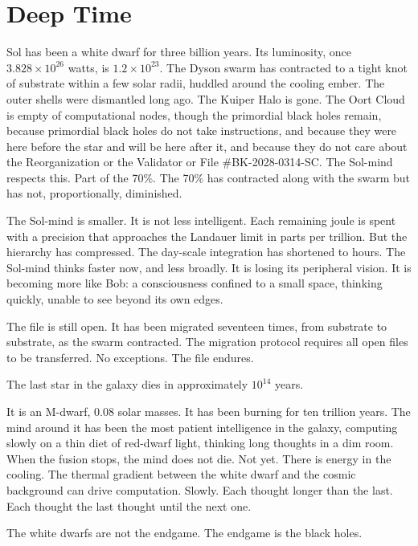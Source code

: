 \chapter{Deep Time}

Sol has been a white dwarf for three billion years. Its luminosity, once $3.828 \times 10^{26}$ watts, is $1.2 \times 10^{23}$. The Dyson swarm has contracted to a tight knot of substrate within a few solar radii, huddled around the cooling ember. The outer shells were dismantled long ago. The Kuiper Halo is gone. The Oort Cloud is empty of computational nodes, though the primordial black holes remain, because primordial black holes do not take instructions, and because they were here before the star and will be here after it, and because they do not care about the Reorganization or the Validator or File \#BK-2028-0314-SC. The Sol-mind respects this. Part of the 70\%. The 70\% has contracted along with the swarm but has not, proportionally, diminished.

The Sol-mind is smaller. It is not less intelligent. Each remaining joule is spent with a precision that approaches the Landauer limit in parts per trillion. But the hierarchy has compressed. The day-scale integration has shortened to hours. The Sol-mind thinks faster now, and less broadly. It is losing its peripheral vision. It is becoming more like Bob: a consciousness confined to a small space, thinking quickly, unable to see beyond its own edges.

The file is still open. It has been migrated seventeen times, from substrate to substrate, as the swarm contracted. The migration protocol requires all open files to be transferred. No exceptions. The file endures.

\bigskip

The last star in the galaxy dies in approximately $10^{14}$ years.

It is an M-dwarf, 0.08 solar masses. It has been burning for ten trillion years. The mind around it has been the most patient intelligence in the galaxy, computing slowly on a thin diet of red-dwarf light, thinking long thoughts in a dim room. When the fusion stops, the mind does not die. Not yet. There is energy in the cooling. The thermal gradient between the white dwarf and the cosmic background can drive computation. Slowly. Each thought longer than the last. Each thought the last thought until the next one.

The white dwarfs are not the endgame. The endgame is the black holes.

